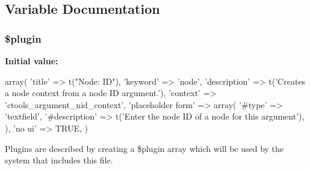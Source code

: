 \subsection{Variable Documentation}
\hypertarget{nid_8inc_ada8a7130088351710bb02ed622d6bf65}{
\subsubsection[{\$plugin}]{\setlength{\rightskip}{0pt plus 5cm}\$plugin}}
\label{nid_8inc_ada8a7130088351710bb02ed622d6bf65}
{\bfseries Initial value:}
\begin{DoxyCode}
 array(
  'title' => t("Node: ID"),
  'keyword' => 'node',
  'description' => t('Creates a node context from a node ID argument.'),
  'context' => 'ctools_argument_nid_context',
  'placeholder form' => array(
    '#type' => 'textfield',
    '#description' => t('Enter the node ID of a node for this argument'),
  ),
  'no ui' => TRUE,
)
\end{DoxyCode}
Plugins are described by creating a \$plugin array which will be used by the system that includes this file. 
